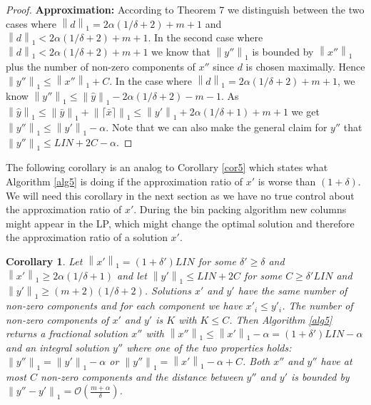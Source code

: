 \documentclass[a4paper,11pt]{article}
\newcommand{\nor}[1]{\left\|#1\right\|}
\newtheorem{cor}[thm]{Corollary}
\begin{document}
\begin{proof}
	{\bf Approximation:} According to Theorem 7 we distinguish between the two cases where 
	$\nor{d}_1 = 2 \alpha (1/ \delta +2) +m+1$ and $\nor{d}_1 < 2 \alpha (1/ \delta +2) +m+1$. In the second case where
	$\nor{d}_1 < 2 \alpha (1/ \delta +2) +m+1$ we know that $\nor{y''}_1$ is bounded by $\nor{x''}_1$ plus the number
	of non-zero components of $x''$ since $d$ is chosen maximally. Hence $\nor{y''}_1 \leq \nor{x''}_1 + C$.
	In the case where $\nor{d}_1 = 2 \alpha (1/ \delta +2) +m+1$, we know $\nor{y''}_1 \leq \nor{\hat{y}}_1 -
	2 \alpha (1/ \delta +2) -m-1$. As $\nor{\hat{y}}_1 \leq \nor{\bar{y}}_1 + \nor{\lceil \bar{x} \rceil}_1 \leq 
	\nor{y'}_1 + 2\alpha(1/\delta+1) +m+1$ we get $\nor{y''}_1 \leq \nor{y'}_1 - \alpha$.
	Note that we can also make the general claim for $y''$ that $\nor{y''}_1 \leq \mathit{LIN} +2C - \alpha$. 
\end{proof}
The following corollary is an analog to Corollary \ref{cor5} which states what Algorithm \ref{alg5} is doing if the approximation
ratio of $x'$ is worse than $(1+ \delta)$. We will need this corollary in the next section as we have no true control
about the approximation ratio of $x'$. During the bin packing algorithm new columns might appear in the LP, 
which might change
the optimal solution and therefore the approximation ratio of a solution $x'$.
\begin{cor}\label{cor9}
	Let $\nor{x'}_1 = (1+ \delta')\mathit{LIN}$ for some $\delta' \geq \delta$ 
	 and $\nor{x'}_1 \geq 2 \alpha (1/ \delta +1)$
	and let $\nor{y'}_1 \leq \mathit{LIN} + 2C$ for some
	$C \geq \delta'\mathit{LIN}$ and $\nor{y'}_1 \geq (m+2)(1/\delta +2)$. 
	Solutions $x'$ and $y'$ have the same number of non-zero components and for each component we have 
	 $x'_i \leq y'_i$. The number of non-zero components of $x'$ and $y'$ is $K$ with $K \leq C$. 
	 Then Algorithm \ref{alg5} returns a fractional solution
	$x''$ with $\nor{x''}_1 \leq \nor{x'}_1 - \alpha = (1+ \delta')\mathit{LIN} - \alpha$ and an integral solution $y''$ 
	where one of the two properties holds:
	 $\nor{y''}_1 = \nor{y'}_1 - \alpha$ or $\nor{y''}_1 = \nor{x'}_1 - \alpha + C$. 
	Both $x''$ and $y''$ have at most $C$
	non-zero components and the distance between $y''$ and $y'$ is bounded by $\nor{y''-y'}_1 
	= \mathcal{O}(\frac{m + \alpha}{\delta})$.
\end{cor}
\end{document}
